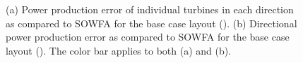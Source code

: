 \documentclass[conf]{new-aiaa}
\begin{document}
\begin{figure}[htpb!]
	\centering
	\caption{(a) Power production error of individual turbines in each direction as compared to SOWFA for the base case layout (). (b) Directional power production error as compared to SOWFA for the base case layout ().  The color bar applies to both (a) and (b).}
	\label{fig:basecase-power-error}
\end{figure}
\end{document}

